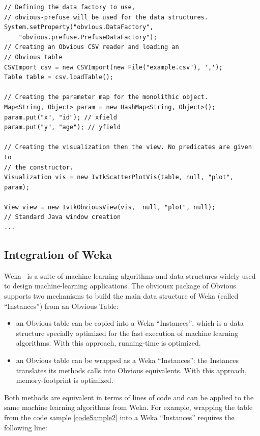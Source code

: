 \begin{lstlisting}[caption={Combining different Obvious implementations to display a scatter-plot},label=codeSample2]
// Defining the data factory to use,
// obvious-prefuse will be used for the data structures.
System.setProperty("obvious.DataFactory",
    "obvious.prefuse.PrefuseDataFactory");
// Creating an Obvious CSV reader and loading an
// Obvious table
CSVImport csv = new CSVImport(new File("example.csv"), ',');
Table table = csv.loadTable();

// Creating the parameter map for the monolithic object.
Map<String, Object> param = new HashMap<String, Object>();
param.put("x", "id"); // xfield
param.put("y", "age"); // yfield

// Creating the visualization then the view. No predicates are given to
// the constructor.
Visualization vis = new IvtkScatterPlotVis(table, null, "plot", param);

View view = new IvtkObviousView(vis,  null, "plot", null);
// Standard Java window creation
...
\end{lstlisting}

\subsection{Integration of Weka}

Weka~\cite{Weka} is a suite of machine-learning algorithms and data
structures widely used to design machine-learning applications.  
The obviousx package of Obvious supports two mechanisms to build the
main data structure of Weka (called ``Instances'') from an Obvious
Table:

\begin{itemize}[noitemsep]
\item an Obvious table can be copied into a Weka ``Instances'', which
  is a data structure specially optimized for the fast execution of
   machine learning algorithms.  With this approach, running-time is
   optimized.
\item an Obvious table can be wrapped as a Weka ``Instances'': the
  Instances translates its methods calls into Obvious equivalents.
  With this approach, memory-footprint is optimized.
\end{itemize}

Both methods are equivalent in terms of lines of code and can be
applied to the same machine learning algorithms from Weka.  For
example, wrapping the table from the code sample \ref{codeSample2}
into a Weka ``Instances''  requires the following line:

